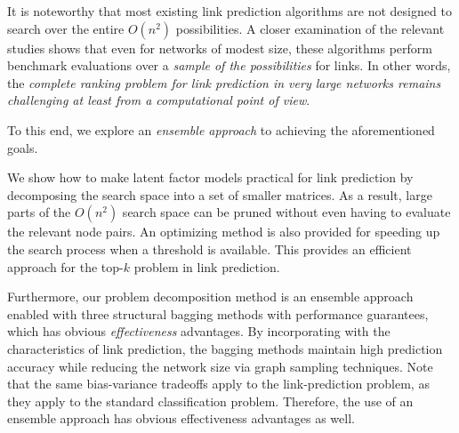 It is noteworthy that most existing link prediction algorithms are not designed to search over the entire 
$O(n^2)$ possibilities. A closer examination of the relevant
studies shows that even for networks of modest size, these
algorithms perform benchmark evaluations over a {\em
sample of the possibilities} for links.  In other
words, the {\em complete ranking problem for link prediction in
very large networks remains challenging at least from a
computational point of view}.





To this end, we explore an {\em ensemble approach} to
achieving the aforementioned goals.

We show how to make latent factor models
practical for link prediction by decomposing the search space into a
 set of smaller matrices. As a result, large parts of the $O(n^2)$
search space can be pruned without even having to evaluate the
relevant node pairs. An optimizing method is also provided for
speeding up the search process when a threshold is available.
This provides an efficient approach for the
top-$k$ problem in link prediction.

Furthermore, our problem
decomposition method is an ensemble approach enabled with three
structural bagging methods with performance guarantees, which has obvious {\em
effectiveness} advantages. By incorporating with the characteristics of  link prediction, the bagging methods maintain high prediction
accuracy while reducing the network size via graph sampling techniques.
Note that the same bias-variance
tradeoffs apply to the link-prediction problem, as they apply to the
standard classification problem. Therefore, the use of an ensemble
approach has obvious effectiveness advantages as well.



